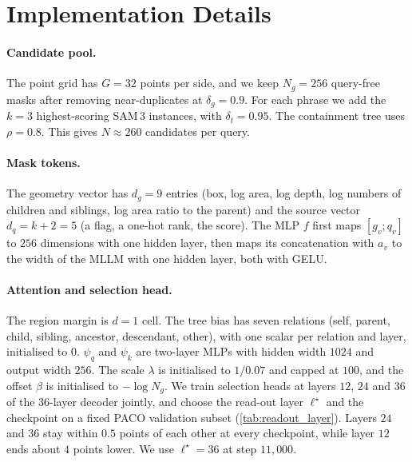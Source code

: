 \section{Implementation Details}
\label{sec:impl}

\paragraph{Candidate pool.}
The point grid has $G=32$ points per side, and we keep $N_g=256$ query-free masks after removing near-duplicates at
$\delta_g=0.9$. For each phrase we add the $k=3$ highest-scoring SAM\,3 instances, with $\delta_t=0.95$. The
containment tree uses $\rho=0.8$. This gives $N\approx260$ candidates per query.

\paragraph{Mask tokens.}
The geometry vector has $d_g=9$ entries (box, log area, log depth, log numbers of children and siblings, log area
ratio to the parent) and the source vector $d_q=k+2=5$ (a flag, a one-hot rank, the score). The MLP $f$ first maps
$[g_v;q_v]$ to $256$ dimensions with one hidden layer, then maps its concatenation with $a_v$ to the width of the
MLLM with one hidden layer, both with GELU.

\paragraph{Attention and selection head.}
The region margin is $d=1$ cell. The tree bias has seven relations (self, parent, child, sibling, ancestor,
descendant, other), with one scalar per relation and layer, initialised to $0$. $\psi_q$ and $\psi_k$ are two-layer
MLPs with hidden width $1024$ and output width $256$. The scale $\lambda$ is initialised to $1/0.07$ and capped at
$100$, and the offset $\beta$ is initialised to $-\log N_g$. We train selection heads at layers $12$, $24$ and $36$ of
the $36$-layer decoder jointly, and choose the read-out layer $\ell^\star$ and the checkpoint on a fixed PACO
validation subset (\cref{tab:readout_layer}). Layers $24$ and $36$ stay within $0.5$ points of each other at every
checkpoint, while layer $12$ ends about $4$ points lower. We use $\ell^\star=36$ at step $11{,}000$.


